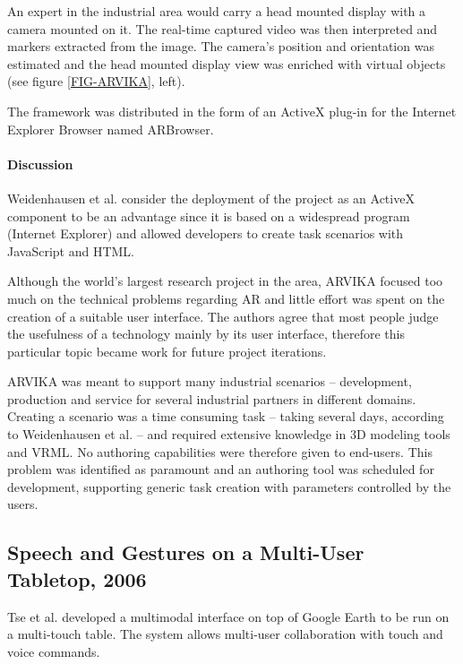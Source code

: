 An expert in the industrial area would carry a head mounted display with a camera mounted on it.
The real-time captured video was then interpreted and markers extracted from the image.
The camera's position and orientation was estimated and the head mounted display view was
enriched with virtual objects (see figure \ref{FIG-ARVIKA}, left).

The framework was distributed in the form of an ActiveX plug-in for the Internet Explorer Browser
named ARBrowser.

\paragraph{Discussion}

Weidenhausen et al. \cite{ARVIKA-LESSONS} consider the deployment of the project as an ActiveX component
to be an advantage since it is based on a widespread program (Internet Explorer) and allowed developers
to create task scenarios with JavaScript and HTML.

Although the world's largest research project in the area, ARVIKA focused too
much on the technical problems regarding AR and little effort was spent on the creation of a
suitable user interface. The authors agree that most people judge the usefulness of a technology
mainly by its user interface, therefore this particular topic became work for future project iterations.

ARVIKA was meant to support many industrial scenarios -- development, production and service for several
industrial partners in different domains. Creating a scenario was a time consuming task -- taking several days,
according to Weidenhausen et al. -- and required extensive knowledge in 3D modeling tools and VRML.
No authoring capabilities were therefore given to end-users.
This problem was identified as paramount and an authoring tool was scheduled for development,
supporting generic task creation with parameters controlled by the users.



\subsection{Speech and Gestures on a Multi-User Tabletop, 2006}

Tse et al. \cite{SP-GEST-TTOP} developed a multimodal interface on top of Google Earth \cite{SITE-EARTH}
to be run on a multi-touch table.
The system allows multi-user collaboration with touch and voice commands.

